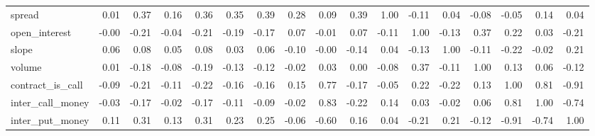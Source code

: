 \begin{tabular}{lrrrrrrrrrrrrrrrr}
spread           &     0.01 &        0.37 &      0.16 &    0.36 &          0.35 &        0.39 &  0.28 &     0.09 &     0.39 &    1.00 &          -0.11 &   0.04 &   -0.08 &             -0.05 &              0.14 &             0.04 \\
open\_interest    &    -0.00 &       -0.21 &     -0.04 &   -0.21 &         -0.19 &       -0.17 &  0.07 &    -0.01 &     0.07 &   -0.11 &           1.00 &  -0.13 &    0.37 &              0.22 &              0.03 &            -0.21 \\
slope            &     0.06 &        0.08 &      0.05 &    0.08 &          0.03 &        0.06 & -0.10 &    -0.00 &    -0.14 &    0.04 &          -0.13 &   1.00 &   -0.11 &             -0.22 &             -0.02 &             0.21 \\
volume           &     0.01 &       -0.18 &     -0.08 &   -0.19 &         -0.13 &       -0.12 & -0.02 &     0.03 &     0.00 &   -0.08 &           0.37 &  -0.11 &    1.00 &              0.13 &              0.06 &            -0.12 \\
contract\_is\_call &    -0.09 &       -0.21 &     -0.11 &   -0.22 &         -0.16 &       -0.16 &  0.15 &     0.77 &    -0.17 &   -0.05 &           0.22 &  -0.22 &    0.13 &              1.00 &              0.81 &            -0.91 \\
inter\_call\_money &    -0.03 &       -0.17 &     -0.02 &   -0.17 &         -0.11 &       -0.09 & -0.02 &     0.83 &    -0.22 &    0.14 &           0.03 &  -0.02 &    0.06 &              0.81 &              1.00 &            -0.74 \\
inter\_put\_money  &     0.11 &        0.31 &      0.13 &    0.31 &          0.23 &        0.25 & -0.06 &    -0.60 &     0.16 &    0.04 &          -0.21 &   0.21 &   -0.12 &             -0.91 &             -0.74 &             1.00 \\
\bottomrule
\end{tabular}

